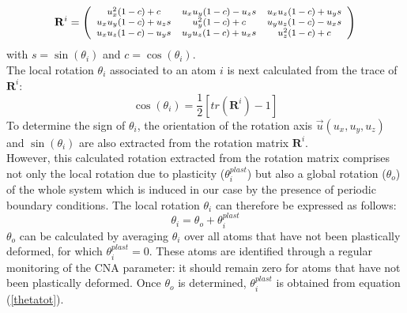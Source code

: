 \documentclass[final,3p,times,twocolumn]{elsarticle}
\begin{document}
\begin{equation}
	\mathbf{R}^{i}=\begin{footnotesize}\left(
	\begin{array}{ccc}
	u_{x}^{2}(1-c)+c & u_{x}u_{y}(1-c)-u_{z}s & u_{x}u_{z}(1-c)+u_{y}s \\
	u_{x}u_{y}(1-c)+u_{z}s & u_{y}^{2}(1-c)+c & u_{y}u_{z}(1-c)-u_{x}s \\
	u_{x}u_{z}(1-c)-u_{y}s & u_{y}u_{z}(1-c)+u_{x}s & u_{z}^{2}(1-c)+c \\
	\end{array}
	\right)\end{footnotesize}
\end{equation}
with $ s=\sin(\theta_{i}) $ and $ c=\cos(\theta_{i}) $. \\
The local rotation $ \theta_{i} $ associated to an atom $ i $ is next calculated from the trace of $ \mathbf{R}^{i} $:
\begin{equation}
	\cos(\theta_{i})=\frac{1}{2}\left[tr\left(\mathbf{R}^{i}\right)-1\right]
\end{equation}
To determine the sign of $ \theta_{i} $, the orientation of the rotation axis $ \overrightarrow{u}(u_{x},u_{y},u_{z}) $ and $\sin(\theta_{i}) $ are also extracted from the rotation matrix $ \mathbf{R}^{i} $.
\\
However, this calculated rotation extracted from the rotation matrix comprises not only the local rotation due to plasticity ($ \theta_{i}^{plast} $) but also a global rotation ($ \theta_{o} $) of the whole system which is induced in our case by the presence of periodic boundary conditions. The local rotation $ \theta_{i} $ can therefore be expressed as follows:
\begin{equation}\label{thetatot}
\theta_{i}=\theta_{o}+\theta_{i}^{plast}
\end{equation}
$ \theta_{o} $ can be calculated by averaging $ \theta_{i} $ over all atoms that have not been plastically deformed, for which $ \theta_{i}^{plast}=0 $. These atoms are identified through a regular monitoring of the CNA parameter: it should remain zero for atoms that have not been plastically deformed. Once $ \theta_{o} $ is determined, $ \theta_{i}^{plast} $ is obtained from equation (\ref{thetatot}).
\end{document}
